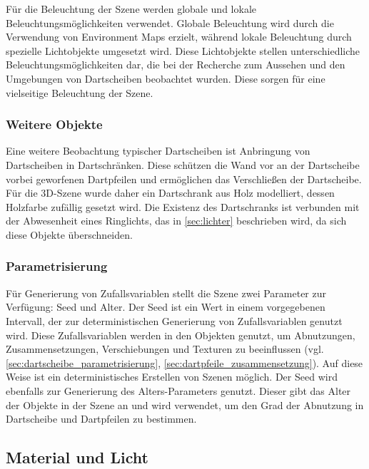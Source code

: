 Für die Beleuchtung der Szene werden globale und lokale Beleuchtungsmöglichkeiten verwendet. Globale Beleuchtung wird durch die Verwendung von Environment Maps erzielt, während lokale Beleuchtung durch spezielle Lichtobjekte umgesetzt wird. Diese Lichtobjekte stellen unterschiedliche Beleuchtungsmöglichkeiten dar, die bei der Recherche zum Aussehen und den Umgebungen von Dartscheiben beobachtet wurden. Diese sorgen für eine vielseitige Beleuchtung der Szene.

\subsubsection{Weitere Objekte}
\label{sec:weitere_objekte}

Eine weitere Beobachtung typischer Dartscheiben ist Anbringung von Dartscheiben in Dartschränken. Diese schützen die Wand vor an der Dartscheibe vorbei geworfenen Dartpfeilen und ermöglichen das Verschließen der Dartscheibe. Für die 3D-Szene wurde daher ein Dartschrank aus Holz modelliert, dessen Holzfarbe zufällig gesetzt wird. Die Existenz des Dartschranks ist verbunden mit der Abwesenheit eines Ringlichts, das in \autoref{sec:lichter} beschrieben wird, da sich diese Objekte überschneiden.

\subsubsection{Parametrisierung}
\label{sec:parameter}

Für Generierung von Zufallsvariablen stellt die Szene zwei Parameter zur Verfügung: Seed und Alter. Der Seed ist ein Wert in einem vorgegebenen Intervall, der zur deterministischen Generierung von Zufallsvariablen genutzt wird. Diese Zufallsvariablen werden in den Objekten genutzt, um Abnutzungen, Zusammensetzungen, Verschiebungen und Texturen zu beeinflussen (vgl. \autoref{sec:dartscheibe_parametrisierung}, \autoref{sec:dartpfeile_zusammensetzung}). Auf diese Weise ist ein deterministisches Erstellen von Szenen möglich. Der Seed wird ebenfalls zur Generierung des Alters-Parameters genutzt. Dieser gibt das Alter der Objekte in der Szene an und wird verwendet, um den Grad der Abnutzung in Dartscheibe und Dartpfeilen zu bestimmen.


\subsection{Material und Licht}  %
\label{sec:material_licht}

